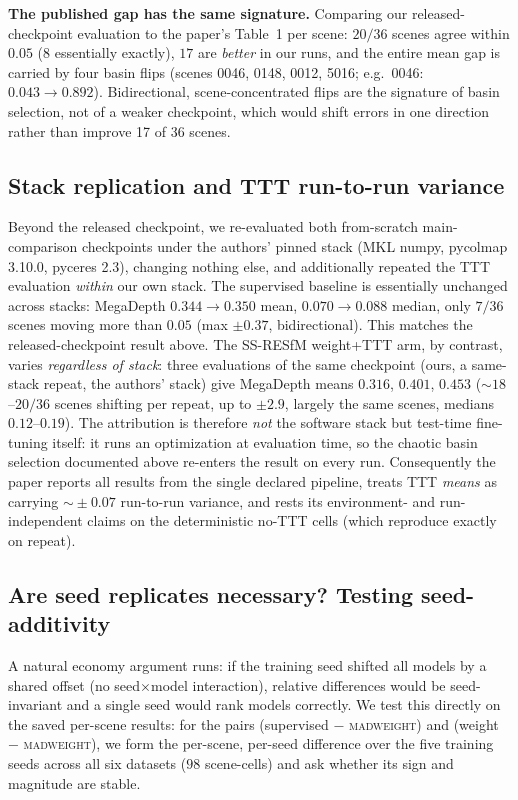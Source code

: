 \documentclass[10pt,twocolumn,letterpaper]{article}
\newcommand{\mad}{\textsc{madweight}}
\begin{document}
\noindent\textbf{The published gap has the same signature.} Comparing our released-checkpoint
evaluation to the paper's Table~1 per scene: $20/36$ scenes agree within $0.05$
($8$ essentially exactly), $17$ are \emph{better} in our runs, and the entire mean gap is carried by four
basin flips (scenes 0046, 0148, 0012, 5016; e.g.\ 0046: $0.043 \to 0.892$). Bidirectional,
scene-concentrated flips are the signature of basin selection, not of a weaker checkpoint,
which would shift errors in one direction rather than improve 17 of 36 scenes.

\subsection{Stack replication and TTT run-to-run variance}\label{sec:ttt}
Beyond the released checkpoint, we re-evaluated both from-scratch main-comparison
checkpoints under the authors' pinned stack (MKL numpy, pycolmap 3.10.0, pyceres 2.3),
changing nothing else, and additionally repeated the TTT evaluation \emph{within} our own
stack. The supervised baseline is essentially unchanged across stacks: MegaDepth
$0.344\!\to\!0.350$ mean, $0.070\!\to\!0.088$ median, only $7/36$ scenes moving more than
$0.05$ (max $\pm0.37$, bidirectional). This matches the released-checkpoint
result above. The SS-RESfM weight+TTT arm, by contrast, varies \emph{regardless of stack}:
three evaluations of the same checkpoint (ours, a same-stack repeat, the authors' stack)
give MegaDepth means $0.316$, $0.401$, $0.453$ ($\sim\!18$--$20/36$ scenes shifting per
repeat, up to $\pm2.9$, largely the same scenes, medians $0.12$--$0.19$). The
attribution is therefore \emph{not} the software stack but test-time fine-tuning itself:
it runs an optimization at evaluation time, so the chaotic basin selection documented
above re-enters the result on every run. Consequently the paper reports all results from
the single declared pipeline, treats TTT \emph{means} as carrying $\sim\!\pm0.07$
run-to-run variance, and rests its environment- and run-independent claims on the
deterministic no-TTT cells (which reproduce exactly on repeat).

\subsection{Are seed replicates necessary? Testing seed-additivity}\label{sec:interaction}
A natural economy argument runs: if the training seed shifted all models by a shared
offset (no seed$\times$model interaction), relative differences would be seed-invariant
and a single seed would rank models correctly. We test this directly on the saved
per-scene results: for the pairs (supervised $-$ \mad{}) and (weight $-$ \mad{}), we
form the per-scene, per-seed difference over the five training seeds across all six
datasets ($98$ scene-cells) and ask whether its sign and magnitude are stable.
\end{document}
